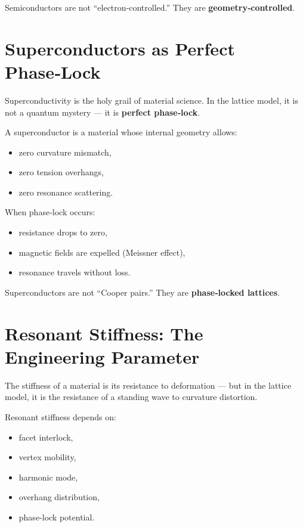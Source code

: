 \documentclass[11pt, letterpaper, openany]{book}
\begin{document}
Semiconductors are not “electron‑controlled.”  
They are \textbf{geometry‑controlled}.

\section{Superconductors as Perfect Phase‑Lock}

Superconductivity is the holy grail of material science. In the lattice model, it is not a
quantum mystery — it is \textbf{perfect phase‑lock}.

A superconductor is a material whose internal geometry allows:

\begin{itemize}
    \item zero curvature mismatch,
    \item zero tension overhangs,
    \item zero resonance scattering.
\end{itemize}

When phase‑lock occurs:

\begin{itemize}
    \item resistance drops to zero,
    \item magnetic fields are expelled (Meissner effect),
    \item resonance travels without loss.
\end{itemize}

Superconductors are not “Cooper pairs.”  
They are \textbf{phase‑locked lattices}.

\section{Resonant Stiffness: The Engineering Parameter}

The stiffness of a material is its resistance to deformation — but in the lattice model, it is
the resistance of a standing wave to curvature distortion.

Resonant stiffness depends on:

\begin{itemize}
    \item facet interlock,
    \item vertex mobility,
    \item harmonic mode,
    \item overhang distribution,
    \item phase‑lock potential.
\end{itemize}
\end{document}
